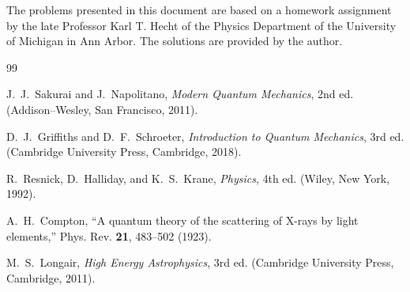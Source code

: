 \documentclass[10pt,a4paper]{article}
\begin{document}
The problems presented in this document are based on a homework assignment by the late Professor Karl T. Hecht of the Physics Department of the University of Michigan in Ann Arbor. The solutions are provided by the author.
\begin{thebibliography}{99}

J.~J.~Sakurai and J.~Napolitano,
\textit{Modern Quantum Mechanics}, 2nd ed.
(Addison--Wesley, San Francisco, 2011).

D.~J.~Griffiths and D.~F.~Schroeter,
\textit{Introduction to Quantum Mechanics}, 3rd ed.
(Cambridge University Press, Cambridge, 2018).

R.~Resnick, D.~Halliday, and K.~S.~Krane,
\textit{Physics}, 4th ed.
(Wiley, New York, 1992).

A.~H.~Compton,
``A quantum theory of the scattering of X-rays by light elements,''
Phys. Rev. \textbf{21}, 483--502 (1923).

M.~S.~Longair,
\textit{High Energy Astrophysics}, 3rd ed.
(Cambridge University Press, Cambridge, 2011).

\end{thebibliography}
\end{document}
